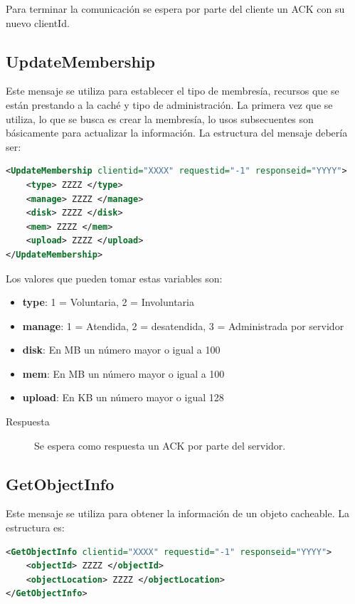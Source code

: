 Para terminar la comunicación se espera por parte del cliente un ACK con su nuevo clientId.

\subsection{UpdateMembership}

Este mensaje se utiliza para establecer el tipo de membresía, recursos que se están prestando a la caché y tipo de administración. La primera vez que se utiliza, lo que se busca es crear la membresía, lo usos subsecuentes son básicamente para actualizar la información. La estructura del mensaje debería ser:

\begin{lstlisting}[language=XML,caption=Mensaje de UpdateMembership]
<UpdateMembership clientid="XXXX" requestid="-1" responseid="YYYY"> 
	<type> ZZZZ </type>
	<manage> ZZZZ </manage>
	<disk> ZZZZ </disk>
	<mem> ZZZZ </mem>
	<upload> ZZZZ </upload>
</UpdateMembership>
\end{lstlisting}

Los valores que pueden tomar estas variables son:

\begin{itemize}
\item \textbf{type}: 1 = Voluntaria, 2 = Involuntaria
\item \textbf{manage}: 1 = Atendida, 2 = desatendida, 3 = Administrada por servidor
\item \textbf{disk}: En MB un número mayor o igual a 100
\item \textbf{mem}: En MB un número mayor o igual a 100
\item \textbf{upload}: En KB un número mayor o igual 128
\end{itemize}

\begin{description}
\item[Respuesta] Se espera como respuesta un ACK por parte del servidor.
\end{description}

\subsection{GetObjectInfo}
Este mensaje se utiliza para obtener la información de un objeto cacheable. La estructura es:

\begin{lstlisting}[language=XML,caption=Mensaje de GetObjectInfo]
<GetObjectInfo clientid="XXXX" requestid="-1" responseid="YYYY"> 
	<objectId> ZZZZ </objectId>
	<objectLocation> ZZZZ </objectLocation>
</GetObjectInfo>
\end{lstlisting}

